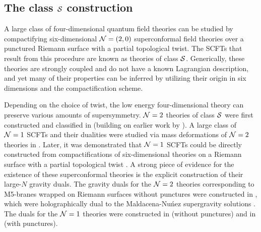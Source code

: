 \documentclass[a4paper,11pt]{article}
\def\CN{{\cal N}}
\def\CS{{\cal S}}
\begin{document}
\subsection{The class $\CS$ construction}%
\label{sec:construction}

A large class of four-dimensional quantum  field theories can be studied by compactifying six-dimensional $\CN=(2,0)$ superconformal field theories over a punctured Riemann surface with a partial topological twist. The SCFTs that result from this procedure are known as theories of class $\CS$. Generically, these theories are strongly coupled and do not have a known Lagrangian description, and yet many of their properties can be inferred by utilizing their origin in six dimensions and the compactification scheme. 


Depending on the choice of twist, the low energy four-dimensional theory can preserve various amounts of supersymmetry.  $\CN=2$ theories of class $\CS$ were first constructed and classified in \cite{Gaiotto:2009we, Gaiotto:2009hg} (building on earlier work by \cite{Witten:1997sc}).
A large class of $\CN=1$ SCFTs and their dualities were studied via mass deformations of $\CN=2$ theories in \cite{Maruyoshi:2009uk,Benini:2009mz,Bah:2011je}. 
Later, it was demonstrated that $\CN=1$ SCFTs could be directly constructed from compactifications of six-dimensional theories on a Riemann surface with a partial topological twist \cite{Bah:2012dg,Bah:2011vv}. A strong piece of evidence for the existence of these superconformal theories is the explicit construction of their large-$N$ gravity duals. The gravity duals for the $\CN=2$ theories corresponding to M5-branes wrapped on Riemann surfaces without punctures were constructed in \cite{Gaiotto:2009gz}, which were holographically dual to the Maldacena-Nu{\'n}ez supergravity solutions \cite{Maldacena:2000mw}. The duals for the $\CN=1$ theories were constructed in \cite{Bah:2012dg,Bah:2011vv} (without punctures) and in \cite{Bah:2015fwa} (with punctures).
\end{document}

